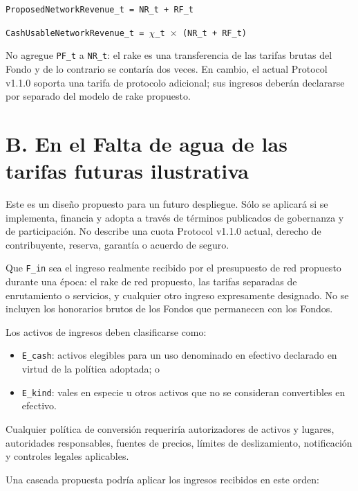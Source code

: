 \documentclass[11pt]{article}
\begin{document}
\texttt{ProposedNetworkRevenue\_t = NR\_t + RF\_t}

\texttt{CashUsableNetworkRevenue\_t = $\chi$\_t $\times$ (NR\_t + RF\_t)}

No agregue \texttt{PF\_t} a \texttt{NR\_t}: el rake es una transferencia de las tarifas brutas del Fondo y de lo contrario se contaría dos veces. En cambio, el actual Protocol v1.1.0 soporta una tarifa de protocolo adicional; sus ingresos deberán declararse por separado del modelo de rake propuesto.


\section*{B. En el Falta de agua de las tarifas futuras ilustrativa}

Este es un diseño propuesto para un futuro despliegue. Sólo se aplicará si se implementa, financia y adopta a través de términos publicados de gobernanza y de participación. No describe una cuota Protocol v1.1.0 actual, derecho de contribuyente, reserva, garantía o acuerdo de seguro.

Que \texttt{F\_in} sea el ingreso realmente recibido por el presupuesto de red propuesto durante una época: el rake de red propuesto, las tarifas separadas de enrutamiento o servicios, y cualquier otro ingreso expresamente designado. No se incluyen los honorarios brutos de los Fondos que permanecen con los Fondos.

Los activos de ingresos deben clasificarse como:

\begin{itemize}[leftmargin=*]
\item \texttt{E\_cash}: activos elegibles para un uso denominado en efectivo declarado en virtud de la política adoptada; o
\item \texttt{E\_kind}: vales en especie u otros activos que no se consideran convertibles en efectivo.
\end{itemize}
Cualquier política de conversión requeriría autorizadores de activos y lugares, autoridades responsables, fuentes de precios, límites de deslizamiento, notificación y controles legales aplicables.

Una cascada propuesta podría aplicar los ingresos recibidos en este orden:
\end{document}
